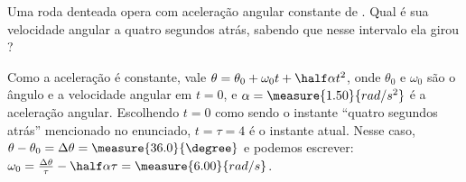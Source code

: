 \begin{question}
    Uma roda denteada opera com aceleração angular constante de .
    Qual é sua velocidade angular a quatro segundos atrás, sabendo que nesse intervalo ela girou ?

    \begin{answer}
    \end{answer}

    \begin{solution}
      Como a aceleração é constante, vale $\theta = \theta_0 + \omega_0 t + \half \alpha t^2$, onde $\theta_0$ e $\omega_0$ são o ângulo e a velocidade angular em $t = 0$, e $\alpha = \measure{1.50}{rad/s^2}$ é a aceleração angular.
      Escolhendo $t = 0$ como sendo o instante ``quatro segundos atrás'' mencionado no enunciado, $t = \tau = 4$ é o instante atual.
      Nesse caso, $\theta - \theta_0 = \Delta\theta = \measure{36.0}{\degree}$ e podemos escrever: $\omega_0 = \frac{\Delta\theta}{\tau} - \half \alpha \tau = \measure{6.00}{rad/s}$.
    \end{solution}
\end{question}